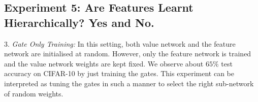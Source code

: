 \subsection{Experiment 5: Are Features Learnt Hierarchically? Yes and No.}





\indent\quad $3.$ \emph{Gate Only Training:} In this setting, both value network and the feature network are initialised at random. However, only the feature network is trained and the value network weights are kept fixed. We observe about $65\%$ test accuracy on CIFAR-10 by just training the gates. This experiment can be interpreted as tuning the gates in such a manner to select the right sub-network of random weights.
 